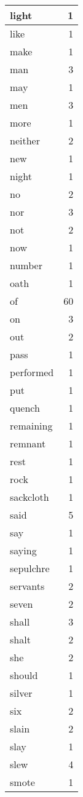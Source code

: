 \begin{center}
\begin{longtable}{l|r}
light & 1 \\ \hline
like & 1 \\ \hline
make & 1 \\ \hline
man & 3 \\ \hline
may & 1 \\ \hline
men & 3 \\ \hline
more & 1 \\ \hline
neither & 2 \\ \hline
new & 1 \\ \hline
night & 1 \\ \hline
no & 2 \\ \hline
nor & 3 \\ \hline
not & 2 \\ \hline
now & 1 \\ \hline
number & 1 \\ \hline
oath & 1 \\ \hline
of & 60 \\ \hline
on & 3 \\ \hline
out & 2 \\ \hline
pass & 1 \\ \hline
performed & 1 \\ \hline
put & 1 \\ \hline
quench & 1 \\ \hline
remaining & 1 \\ \hline
remnant & 1 \\ \hline
rest & 1 \\ \hline
rock & 1 \\ \hline
sackcloth & 1 \\ \hline
said & 5 \\ \hline
say & 1 \\ \hline
saying & 1 \\ \hline
sepulchre & 1 \\ \hline
servants & 2 \\ \hline
seven & 2 \\ \hline
shall & 3 \\ \hline
shalt & 2 \\ \hline
she & 2 \\ \hline
should & 1 \\ \hline
silver & 1 \\ \hline
six & 2 \\ \hline
slain & 2 \\ \hline
slay & 1 \\ \hline
slew & 4 \\ \hline
smote & 1 \\ \hline

\end{longtable}
\end{center}
